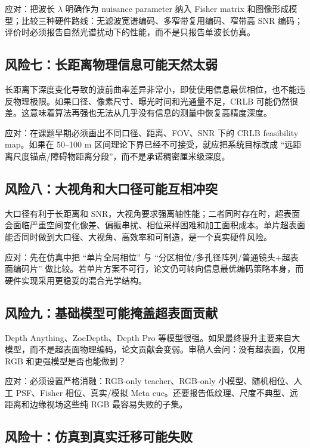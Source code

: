 \documentclass[11pt,a4paper,fontset=none]{ctexart}
\begin{document}
应对：把波长 $\lambda$ 明确作为 nuisance parameter 纳入 Fisher matrix 和图像形成模型；比较三种硬件路线：无滤波宽谱编码、多窄带复用编码、窄带高 SNR 编码；评价时必须报告自然光谱扰动下的性能，而不是只报告单波长仿真。

\subsection{风险七：长距离物理信息可能天然太弱}

长距离下深度变化导致的波前曲率差异非常小，即使使用信息最优相位，也不能违反物理极限。如果口径、像素尺寸、曝光时间和光通量不足，CRLB 可能仍然很差。这意味着算法再强也无法从几乎没有信息的测量中恢复高精度深度。

应对：在课题早期必须画出不同口径、距离、FOV、SNR 下的 CRLB feasibility map。如果在 50--100 m 区间理论下界已经不可接受，就应把系统目标改成 ``远距离尺度锚点/障碍物距离分段''，而不是承诺稠密厘米级深度。

\subsection{风险八：大视角和大口径可能互相冲突}

大口径有利于长距离和 SNR，大视角要求强离轴性能；二者同时存在时，超表面会面临严重空间变化像差、偏振串扰、相位采样困难和加工面积成本。单片超表面能否同时做到大口径、大视角、高效率和可制造，是一个真实硬件风险。

应对：先在仿真中把 ``单片全局相位'' 与 ``分区相位/多孔径阵列/普通镜头+超表面编码片'' 做比较。若单片方案不可行，论文仍可转向信息最优编码策略本身，而硬件实现采用更稳妥的混合光学结构。

\subsection{风险九：基础模型可能掩盖超表面贡献}

Depth Anything、ZoeDepth、Depth Pro 等模型很强。如果最终提升主要来自大模型，而不是超表面物理编码，论文贡献会变弱。审稿人会问：没有超表面，仅用 RGB 和更强模型是否也能做到？

应对：必须设置严格消融：RGB-only teacher、RGB-only 小模型、随机相位、人工 PSF、Fisher 相位、真实/模拟 Meta cue。还要报告低纹理、尺度不典型、远距离和边缘视场这些纯 RGB 最容易失败的子集。

\subsection{风险十：仿真到真实迁移可能失败}
\end{document}
